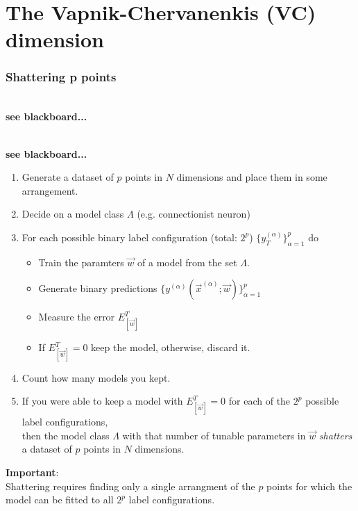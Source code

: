 \section{The Vapnik-Chervanenkis (VC) dimension}


\begin{frame}\frametitle{Shattering p points}

\\

\textbf{see blackboard...}


\\


\textbf{see blackboard...}


\pause

\begin{enumerate}
\item Generate a dataset of $p$ points in $N$ dimensions and place them in some arrangement.
\item Decide on a model class $\Lambda$ (e.g. connectionist neuron)
\item For each possible binary label configuration (total: $2^p$) $\{y_T^{(\alpha)}\}_{\alpha=1}^p$ do
	\begin{itemize}
	\item[] Train the paramters $\vec w$ of a model from the set $\Lambda$.
	\item[] Generate binary predictions $\{y^{(\alpha)}(\vec x^{(\alpha)}; \vec w)\}_{\alpha=1}^p$
	\item[] Measure the error $E^T_{[\vec w]}$
	\item[] If $E^T_{[\vec w]} = 0$ keep the model, otherwise, discard it. 
	\end{itemize}
\item Count how many models you kept.\\
\item[] If you were able to keep a model with $E^T_{[\vec w]} = 0$ for each of the $2^p$ possible label configurations,\\
then the model class $\Lambda$ with that number of tunable parameters in $\vec w$ \emph{shatters} a dataset of $p$ points in $N$ dimensions.
\end{enumerate}

\textbf{Important}:\\

Shattering requires finding only a single arrangment of the $p$ points for which the model can be fitted to all $2^p$ label configurations.

\end{frame}

